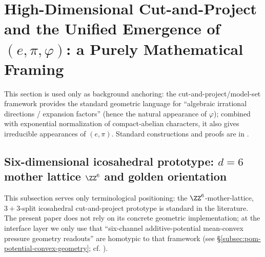 \section{High-Dimensional Cut-and-Project and the Unified Emergence of \texorpdfstring{$(e,\pi,\varphi)$}{(e, pi, varphi)}: a Purely Mathematical Framing}\label{sec:high-dimensional-cut-project}

This section is used only as background anchoring: the cut-and-project/model-set framework provides the standard geometric language for ``algebraic irrational directions / expansion factors'' (hence the natural appearance of \(\varphi\)); combined with exponential normalization of compact-abelian characters, it also gives irreducible appearances of \((e,\pi)\). Standard constructions and proofs are in \cite{BaakeGrimmAperiodicOrder1,MeyerAlgebraicNumbers,QueffelecSubstitution}.

\subsection{Six-dimensional icosahedral prototype: \texorpdfstring{$d=6$}{d=6} mother lattice \texorpdfstring{$\ZZ^6$}{Z6} and golden orientation}\label{subsec:icosahedral-6d-model-set}
This subsection serves only terminological positioning: the \(\ZZ^6\)-mother-lattice, \(3{+}3\)-split icosahedral cut-and-project prototype is standard in the literature. The present paper does not rely on its concrete geometric implementation; at the interface layer we only use that ``six-channel additive-potential mean-convex pressure geometry readouts'' are homotypic to that framework (see \S\ref{subsec:pom-potential-convex-geometry}; cf. \cite{BaakeGrimmAperiodicOrder1,MeyerAlgebraicNumbers,QueffelecSubstitution}).

